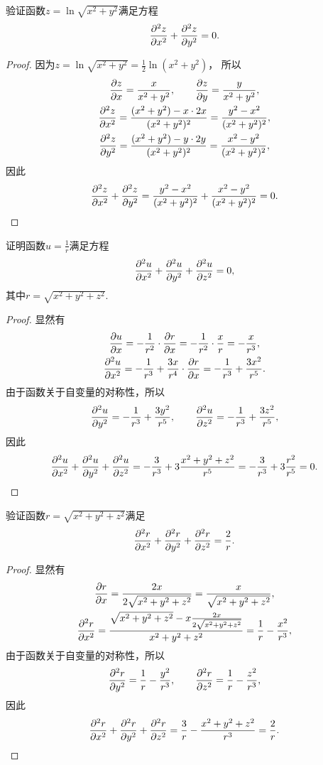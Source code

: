 \begin{example}
验证函数\(z = \ln\sqrt{x^2+y^2}\)满足方程\[
	\pdv[2]{z}{x} + \pdv[2]{z}{y} = 0.
\]
\begin{proof}
因为\(z = \ln\sqrt{x^2+y^2} = \frac{1}{2} \ln(x^2+y^2)\)，
所以\begin{gather*}
	\pdv{z}{x} = \frac{x}{x^2+y^2},
	\qquad
	\pdv{z}{y} = \frac{y}{x^2+y^2}, \\
	\pdv[2]{z}{x} = \frac{(x^2+y^2)-x\cdot2x}{(x^2+y^2)^2}
	= \frac{y^2-x^2}{(x^2+y^2)^2}, \\
	\pdv[2]{z}{y} = \frac{(x^2+y^2)-y\cdot2y}{(x^2+y^2)^2}
	= \frac{x^2-y^2}{(x^2+y^2)^2},
\end{gather*}
因此\[
	\pdv[2]{z}{x} + \pdv[2]{z}{y}
	= \frac{y^2-x^2}{(x^2+y^2)^2} + \frac{x^2-y^2}{(x^2+y^2)^2}
	= 0.
	\qedhere
\]
\end{proof}
\end{example}

\begin{example}
证明函数\(u = \frac{1}{r}\)满足方程\[
	\pdv[2]{u}{x} + \pdv[2]{u}{y} + \pdv[2]{u}{z} = 0,
\]
其中\(r = \sqrt{x^2+y^2+z^2}\).
\begin{proof}
显然有\begin{gather*}
	\pdv{u}{x} = -\frac{1}{r^2}\cdot\pdv{r}{x}
	= -\frac{1}{r^2}\cdot\frac{x}{r}
	= -\frac{x}{r^3}, \\
	\pdv[2]{u}{x} = -\frac{1}{r^3} + \frac{3x}{r^4}\cdot\pdv{r}{x}
	= -\frac{1}{r^3} + \frac{3x^2}{r^5}.
\end{gather*}
由于函数关于自变量的对称性，所以\[
	\pdv[2]{u}{y} = -\frac{1}{r^3} + \frac{3y^2}{r^5},
	\qquad
	\pdv[2]{u}{z} = -\frac{1}{r^3} + \frac{3z^2}{r^5},
\]
因此\[
	\pdv[2]{u}{x} + \pdv[2]{u}{y} + \pdv[2]{u}{z}
	= -\frac{3}{r^3} + 3\frac{x^2+y^2+z^2}{r^5}
	= -\frac{3}{r^3} + 3\frac{r^2}{r^5} = 0.
	\qedhere
\]
\end{proof}
\end{example}

\begin{example}
验证函数\(r = \sqrt{x^2+y^2+z^2}\)满足\[
	\pdv[2]{r}{x} + \pdv[2]{r}{y} + \pdv[2]{r}{z} = \frac{2}{r}.
\]
\begin{proof}
显然有\begin{gather*}
	\pdv{r}{x} = \frac{2x}{2\sqrt{x^2+y^2+z^2}} = \frac{x}{\sqrt{x^2+y^2+z^2}}, \\
	\pdv[2]{r}{x} = \frac{\sqrt{x^2+y^2+z^2}-x\frac{2x}{2\sqrt{x^2+y^2+z^2}}}{x^2+y^2+z^2}
	= \frac{1}{r} - \frac{x^2}{r^3},
\end{gather*}
由于函数关于自变量的对称性，所以\[
	\pdv[2]{r}{y} = \frac{1}{r} - \frac{y^2}{r^3},
	\qquad
	\pdv[2]{r}{z} = \frac{1}{r} - \frac{z^2}{r^3},
\]
因此\[
	\pdv[2]{r}{x} + \pdv[2]{r}{y} + \pdv[2]{r}{z}
	= \frac{3}{r} - \frac{x^2+y^2+z^2}{r^3}
	= \frac{2}{r}.
	\qedhere
\]
\end{proof}
\end{example}


